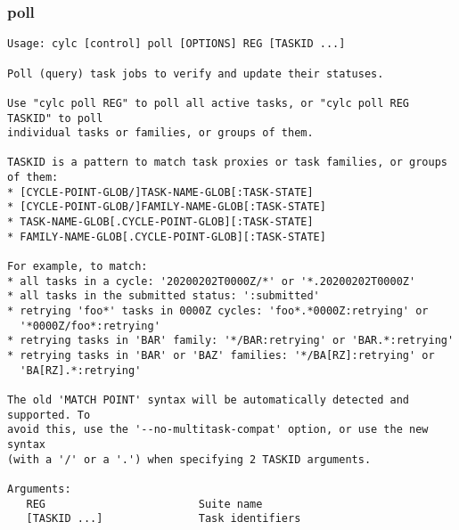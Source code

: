 \subsubsection{poll}
\label{poll}
\begin{lstlisting}
Usage: cylc [control] poll [OPTIONS] REG [TASKID ...] 

Poll (query) task jobs to verify and update their statuses.

Use "cylc poll REG" to poll all active tasks, or "cylc poll REG TASKID" to poll
individual tasks or families, or groups of them.

TASKID is a pattern to match task proxies or task families, or groups of them:
* [CYCLE-POINT-GLOB/]TASK-NAME-GLOB[:TASK-STATE]
* [CYCLE-POINT-GLOB/]FAMILY-NAME-GLOB[:TASK-STATE]
* TASK-NAME-GLOB[.CYCLE-POINT-GLOB][:TASK-STATE]
* FAMILY-NAME-GLOB[.CYCLE-POINT-GLOB][:TASK-STATE]

For example, to match:
* all tasks in a cycle: '20200202T0000Z/*' or '*.20200202T0000Z'
* all tasks in the submitted status: ':submitted'
* retrying 'foo*' tasks in 0000Z cycles: 'foo*.*0000Z:retrying' or
  '*0000Z/foo*:retrying'
* retrying tasks in 'BAR' family: '*/BAR:retrying' or 'BAR.*:retrying'
* retrying tasks in 'BAR' or 'BAZ' families: '*/BA[RZ]:retrying' or
  'BA[RZ].*:retrying'

The old 'MATCH POINT' syntax will be automatically detected and supported. To
avoid this, use the '--no-multitask-compat' option, or use the new syntax
(with a '/' or a '.') when specifying 2 TASKID arguments.

Arguments:
   REG                        Suite name
   [TASKID ...]               Task identifiers


\end{lstlisting}
